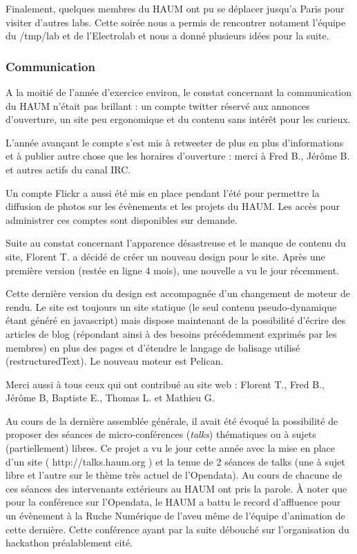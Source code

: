 \documentclass[a4paper, 11pt]{article}
\begin{document}
Finalement, quelques membres du HAUM ont pu se déplacer jusqu'a Paris pour visiter d'autres labs. Cette soirée nous a permis de rencontrer notament l'équipe du /tmp/lab et de l'Electrolab et nous a donné plusieurs idées pour la suite.
    
\subsubsection{Communication}

A la moitié de l'année d'exercice environ, le constat concernant la communication du HAUM n'était pas brillant : un compte twitter réservé aux annonces d'ouverture, un site peu ergonomique et du contenu sans intérêt pour les curieux.

L'année avançant le compte s'est mis à retweeter de plus en plus d'informations et à publier autre chose que les horaires d'ouverture : merci à Fred B., Jérôme B. et autres actifs du canal IRC.

Un compte Flickr a aussi été mis en place pendant l'été pour permettre la diffusion de photos sur les évènements et les projets du HAUM. Les accès pour administrer ces comptes sont disponibles sur demande.

Suite au constat concernant l'apparence désastreuse et le manque de contenu du site, Florent T. a décidé de créer un nouveau design pour le site. Après une première version (restée en ligne 4 mois), une nouvelle a vu le jour récemment.

Cette dernière version du design est accompagnée d'un changement de moteur de rendu. Le site est toujours un site statique (le seul contenu pseudo-dynamique étant généré en javascript) mais dispose maintenant de la possibilité d'écrire des articles de blog (répondant ainsi à des besoins précédemment exprimés par les membres) en plus des pages et d'étendre le langage de balisage utilisé (restructuredText). Le nouveau moteur est Pelican.

Merci aussi à tous ceux qui ont contribué au site web : Florent T., Fred B., Jérôme B, Baptiste E., Thomas L. et Mathieu G.

Au cours de la dernière assemblée générale, il avait été évoqué la possibilité de proposer des séances de micro-conférences (\textit{talks}) thématiques ou à sujets (partiellement) libres.
Ce projet a vu le jour cette année avec la mise en place d'un site ( http://talks.haum.org ) et la tenue de 2 séances de talks (une à sujet libre et l'autre sur le thème très actuel de l'Opendata).
Au cours de chacune de ces séances des intervenants extérieurs au HAUM ont pris la parole. À noter que pour la conférence sur l'Opendata, le HAUM a battu le record d'affluence pour un évènement à la Ruche Numérique de l'aveu même de l'équipe d'animation de cette dernière. Cette conférence ayant par la suite débouché sur l'organisation du hackathon préalablement cité.
\end{document}
